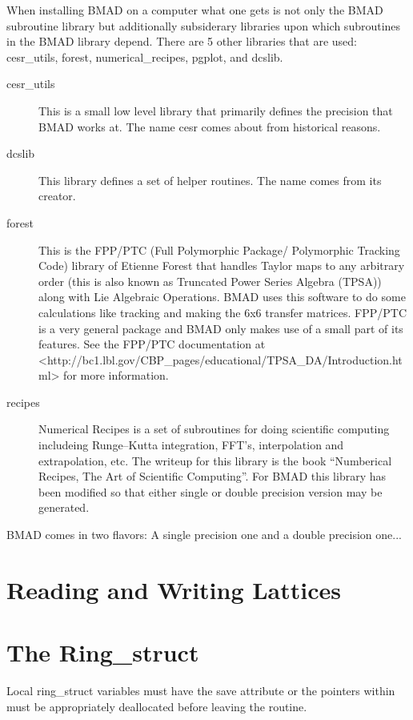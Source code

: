 \documentclass{book}
\begin{document}
When installing BMAD on a computer what one gets is not only the BMAD
subroutine library but additionally subsiderary libraries upon which
subroutines in the BMAD library depend. There are 5 other libraries
that are used: cesr_utils, forest, numerical_recipes, pgplot, and dcslib.
\begin{description}
\item[cesr_utils] This is a small low level library that primarily defines 
the precision that BMAD works at. The name cesr comes about from
historical reasons.
\item[dcslib] This library defines a set of helper routines. 
The name comes from its creator.
\item[forest] This is the FPP/PTC 
(Full Polymorphic Package/ Polymorphic Tracking Code) library of
Etienne Forest that handles Taylor maps to any arbitrary order (this
is also known as Truncated Power Series Algebra (TPSA)) along with Lie
Algebraic Operations. BMAD uses this software to do some calculations
like tracking and making the 6x6 transfer matrices. FPP/PTC is a very
general package and BMAD only makes use of a small part of its
features. See the FPP/PTC documentation at
<http://bc1.lbl.gov/CBP_pages/educational/TPSA_DA/Introduction.html>
for more information.
\item[recipes] Numerical Recipes is a set of subroutines for doing 
scientific computing includeing Runge--Kutta integration, FFT's,
interpolation and extrapolation, etc. The writeup for this library is
the book ``Numberical Recipes, The Art of Scientific Computing''. For
BMAD this library has been modified so that either single or double
precision version may be generated.
\end{description}

BMAD comes in two flavors: A single precision one and a double precision one...


\chapter{Reading and Writing Lattices}

\chapter{The Ring\_struct}

Local ring_struct variables must have the save attribute or
the pointers within must be appropriately deallocated
before leaving the routine.
\end{document}
